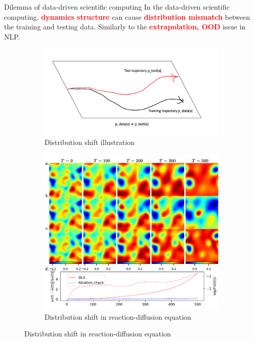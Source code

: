 \documentclass[NUS-Kajima workshop]{beamer}
\begin{document}
\begin{frame}{Dilemma of data-driven scientific computing}
	In the data-driven scientific computing, \textcolor{red}{\textbf{dynamics structure}} can cause \textcolor{red}{\textbf{distribution mismatch}} between the training and testing data.
	Similarly to the \textcolor{red}{\textbf{extrapolation, OOD}} issue in NLP.
	\begin{figure}[ht]
		\centering
		\begin{subfigure}{0.5\linewidth} %
			\centering
			\includegraphics[width=\linewidth]{fig/dilemma.png}
			\caption{Distribution shift illustration}
		  \end{subfigure}%
		  \begin{subfigure}{0.5\linewidth} %
			\centering
			\includegraphics[width=\linewidth]{fig/RD-ds.pdf}
			\caption{Distribution shift in reaction-diffusion equation}
		  \end{subfigure}
	\end{figure}
\end{frame}
\end{document}
